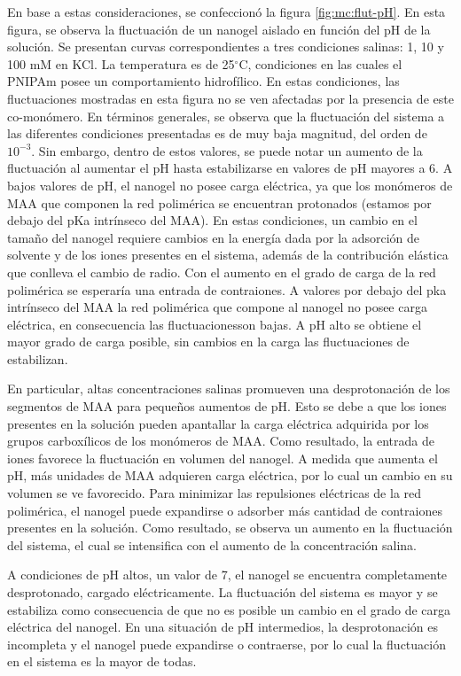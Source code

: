 	En base a estas consideraciones, se confeccion\'o la figura \ref{fig:mc:flut-pH}. En esta figura, se observa la fluctuaci\'on de un nanogel aislado en funci\'on del pH de la soluci\'on. Se presentan curvas correspondientes a tres condiciones salinas: 1, 10 y 100 mM en KCl. La temperatura es de 25$^\circ$C, condiciones en las cuales el PNIPAm posee un comportamiento hidrof\'ilico. En estas condiciones, las fluctuaciones mostradas en esta figura no se ven afectadas por la presencia de este co-mon\'omero.
	En t\'erminos generales, se observa que la fluctuaci\'on del sistema a las diferentes condiciones presentadas es de muy baja magnitud, del orden de $10^{-3}$. Sin embargo, dentro de estos valores, se puede notar un aumento de la fluctuaci\'on al aumentar el pH hasta estabilizarse en valores de pH mayores a 6.
	A bajos valores de pH, el nanogel no posee carga el\'ectrica, ya que los mon\'omeros de MAA que componen la red polim\'erica se encuentran protonados (estamos por debajo del pKa intr\'inseco del MAA). En estas condiciones, un cambio en el tama\~no del nanogel requiere cambios en la energ\'ia dada por la adsorci\'on de solvente y de los iones presentes en el sistema, adem\'as de la contribuci\'on el\'astica que conlleva el cambio de radio.
	Con el aumento en el grado de carga de la red polim\'erica se esperar\'ia una entrada de contraiones. A valores por debajo del pka intr\'inseco del MAA la red polim\'erica que compone al nanogel no posee carga el\'ectrica, en consecuencia las fluctuacionesson bajas. A pH alto se obtiene el mayor grado de carga posible, sin cambios en la carga las fluctuaciones de estabilizan.
	
	En particular, altas concentraciones salinas promueven una desprotonaci\'on de los segmentos de MAA para peque\~nos aumentos de pH. Esto se debe a que los iones presentes en la soluci\'on pueden apantallar la carga el\'ectrica adquirida por los grupos carbox\'ilicos de los mon\'omeros de MAA. Como resultado, la entrada de iones favorece la fluctuaci\'on en volumen del nanogel.
	A medida que aumenta el pH, m\'as unidades de MAA adquieren carga el\'ectrica, por lo cual un cambio en su volumen se ve favorecido. Para minimizar las repulsiones el\'ectricas de la red polim\'erica, el nanogel puede expandirse o adsorber m\'as cantidad de contraiones presentes en la soluci\'on. Como resultado, se observa un aumento en la fluctuaci\'on del sistema, el cual se intensifica con el aumento de la concentraci\'on salina.
	
	A condiciones de pH altos, un valor de 7, el nanogel se encuentra completamente desprotonado, cargado el\'ectricamente. La fluctuaci\'on del sistema es mayor y se estabiliza como consecuencia de que no es posible un cambio en el grado de carga el\'ectrica del nanogel. 
	En una situaci\'on de pH intermedios, la desprotonaci\'on es incompleta y el nanogel puede expandirse o contraerse, por lo cual la fluctuaci\'on en el sistema es la mayor de todas.
	
